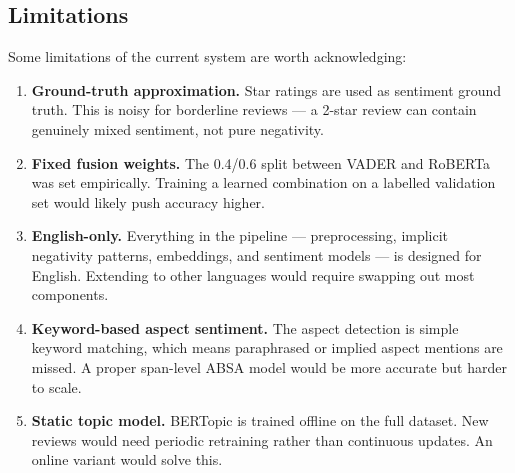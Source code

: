 \subsection{Limitations}
\begin{justify}
Some limitations of the current system are worth acknowledging:

\begin{enumerate}
    \item \textbf{Ground-truth approximation.} Star ratings are used as sentiment ground truth. This is noisy for borderline reviews — a 2-star review can contain genuinely mixed sentiment, not pure negativity.

    \item \textbf{Fixed fusion weights.} The 0.4/0.6 split between VADER and RoBERTa was set empirically. Training a learned combination on a labelled validation set would likely push accuracy higher.

    \item \textbf{English-only.} Everything in the pipeline — preprocessing, implicit negativity patterns, embeddings, and sentiment models — is designed for English. Extending to other languages would require swapping out most components.

    \item \textbf{Keyword-based aspect sentiment.} The aspect detection is simple keyword matching, which means paraphrased or implied aspect mentions are missed. A proper span-level ABSA model would be more accurate but harder to scale.

    \item \textbf{Static topic model.} BERTopic is trained offline on the full dataset. New reviews would need periodic retraining rather than continuous updates. An online variant would solve this.
\end{enumerate}
\end{justify}

